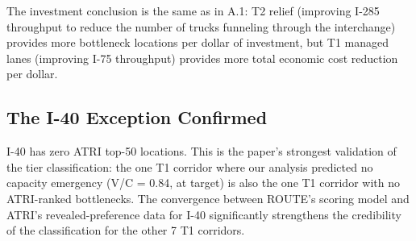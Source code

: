 The investment conclusion is the same as in A.1: T2 relief (improving I-285 throughput to reduce the number of trucks funneling through the interchange) provides more bottleneck locations per dollar of investment, but T1 managed lanes (improving I-75 throughput) provides more total economic cost reduction per dollar.

\subsection{The I-40 Exception Confirmed}

I-40 has zero ATRI top-50 locations. This is the paper's strongest validation of the tier classification: the one T1 corridor where our analysis predicted no capacity emergency (V/C = 0.84, at target) is also the one T1 corridor with no ATRI-ranked bottlenecks. The convergence between ROUTE's scoring model and ATRI's revealed-preference data for I-40 significantly strengthens the credibility of the classification for the other 7 T1 corridors.
